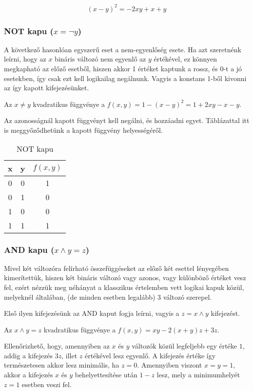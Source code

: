 \begin{align}
	(x-y)^2=-2xy+x+y
\end{align}



\subsubsection{NOT kapu ($x= \neg y$)}

A következő hasonlóan egyszerű eset a nem-egyenlőség esete. Ha azt szeretnénk leírni, hogy az $x$ bináris változó nem egyenlő az $y$ értékével, ez könnyen megkapható az előző esetből, hiszen akkor 1 értéket kaptunk a rossz, és 0-t a jó esetekben, így csak ezt kell logikailag negálnunk. Vagyis a konstans 1-ből kivonni az így kapott kifejezésünket.

\begin{allitas}
	Az $x \neq y$ kvadratikus függvénye a $f(x,y)=1-(x-y)^2=1+2xy-x-y$.
	
	Az azonosságnál kapott függvényt kell negálni, és hozzáadni egyet. Táblázattal itt is meggyőződhetünk a kapott függvény helyességéről.
\end{allitas}

	\begin{table}[ht]
		\footnotesize
		\centering
		\begin{tabular}{ c c c }
			\toprule
			x & y & $f(x,y)$ \\
			\midrule
			0 & 0 & 1 \\
			0 & 1 & 0 \\
			1 & 0 & 0 \\
			1 & 1 & 1 \\		
			\bottomrule
		\end{tabular}
		\caption{NOT kapu}
		\label{tab:NOTgate}
	\end{table}	


\subsubsection{AND kapu ($x \wedge y = z$)}

Mivel két változóra felírható összefüggéseket az előző két esettel lényegében kimerítettük, hiszen két bináris változó vagy azonos, vagy különböző értéket vesz fel, ezért nézzük meg néhányat a klasszikus értelemben vett logikai kapuk közül, melyeknél általában, (de minden esetben legalább) 3 változó szerepel.


Első ilyen kifejezésünk az AND kaput fogja leírni, vagyis a $z=x \wedge y$ kifejezést.
\begin{allitas}
	Az $x \wedge y = z$ kvadratikus függvénye a $f(x,y)=xy-2(x+y)z+3z$.
	
	Ellenőrizhető, hogy, amennyiben az $x$ és $y$ változók közül legfeljebb egy értéke $1$, addig a kifejezés $3z$, illet $z$ értékével lesz egyenlő. A kifejezés értéke így természetesen akkor lesz minimális, ha $z=0$. Amennyiben viszont $x=y=1$, akkor a kifejezés $x$ és $y$ behelyettesítése után $1-z$ lesz, mely a minimumhelyét $z=1$ esetben veszi fel.	
\end{allitas}

